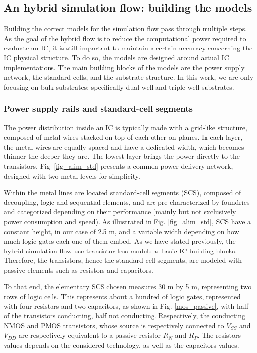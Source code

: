 \subsection{An hybrid simulation flow: building the models}
	Building the correct models for the simulation flow pass through multiple steps.
	As the goal of the hybrid flow is to reduce the computational power required to evaluate an IC, it is still important to maintain a certain accuracy concerning the IC physical structure.
	To do so, the models are designed around actual IC implementations.
	The main building blocks of the models are the power supply network, the standard-cells, and the substrate structure.
	In this work, we are only focusing on bulk substrates: specifically dual-well and triple-well substrates.

	\subsubsection{Power supply rails and standard-cell segments}
	
	The power distribution inside an IC is typically made with a grid-like structure, composed of metal wires stacked on top of each other on planes.
	In each layer, the metal wires are equally spaced and have a dedicated width, which becomes thinner the deeper they are.
	The lowest layer brings the power directly to the transistors.
	Fig. \ref{fig_alim_std} presents a common power delivery network, designed with two metal levels for simplicity.

	Within the metal lines are located standard-cell segments (SCS), composed of decoupling, logic and sequential elements, and are pre-characterized by foundries and categorized depending on their performance (mainly but not exclusively power consumption and speed).
	As illustrated in Fig. \ref{fig_alim_std}, SCS have a constant height, in our case of 2.5 \textmu m, and a variable width depending on how much logic gates each one of them embed.
	As we have stated previously, the hybrid simulation flow use transistor-less models as basic IC building blocks.
	Therefore, the transistors, hence the standard-cell segments, are modeled with passive elements such as resistors and capacitors.

	
	To that end, the elementary SCS chosen measures 30 \textmu m by 5 \textmu m, representing two rows of logic cells.
	This represents about a hundred of logic gates, represented with four resistors and two capacitors, as shown in Fig. \ref{mos_passive}, with half of the transistors conducting, half not conducting.
	Respectively, the conducting NMOS and PMOS transistors, whose source is respectively connected to $V_{SS}$ and $V_{DD}$ are respectively equivalent to a passive resistor $R_N$ and $R_P$.
	The resistors values depends on the considered technology, as well as the capacitors values.

